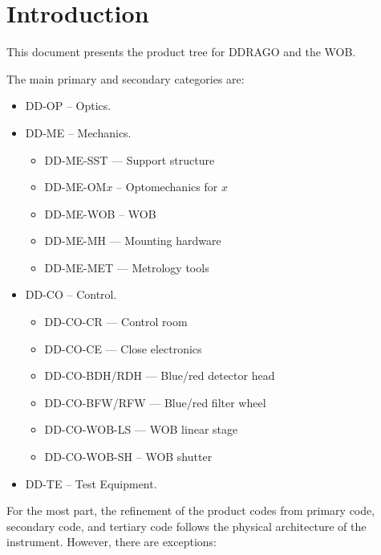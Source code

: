 \documentclass{article}
\begin{document}
\newpage

\pagestyle{plain}

\tableofcontents
\newpage




\clearpage
\section{Introduction}

This document presents the product tree for DDRAGO and the WOB.

The main primary and secondary categories are:
\begin{itemize}
\item DD-OP -- Optics.
\item DD-ME -- Mechanics.
\begin{itemize}
    \item DD-ME-SST –– Support structure
    \item DD-ME-OM$x$ -- Optomechanics for $x$
    \item DD-ME-WOB -- WOB
    \item DD-ME-MH –– Mounting hardware
    \item DD-ME-MET –– Metrology tools
\end{itemize}
\item DD-CO -- Control.
\begin{itemize}
    \item DD-CO-CR –– Control room
    \item DD-CO-CE –– Close electronics
    \item DD-CO-BDH/RDH –– Blue/red detector head
    \item DD-CO-BFW/RFW –– Blue/red filter wheel
    \item DD-CO-WOB-LS –– WOB linear stage
    \item DD-CO-WOB-SH -- WOB shutter
\end{itemize}
\item DD-TE -- Test Equipment.
\end{itemize}

For the most part, the refinement of the product codes from primary code, secondary code, and tertiary code follows the physical architecture of the instrument. However, there are exceptions:
\end{document}

